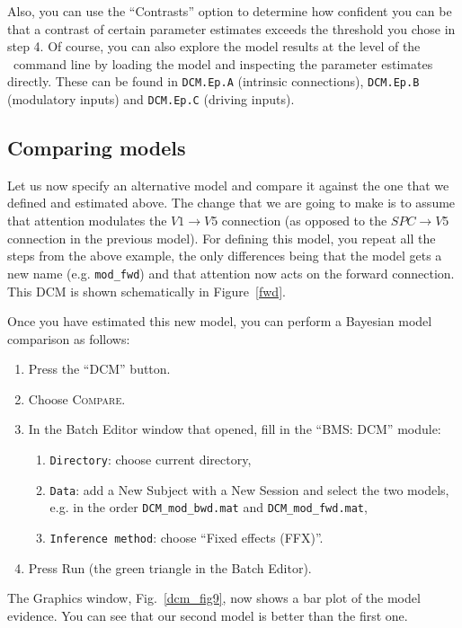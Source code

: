 Also, you can use the ``Contrasts'' option to determine how confident you can be that a contrast of certain parameter estimates exceeds the threshold you chose in step 4.
Of course, you can also explore the model results at the level of the \matlab\ command line by loading the model and inspecting the parameter estimates directly. These can be found in \texttt{DCM.Ep.A} (intrinsic connections), \texttt{DCM.Ep.B} (modulatory inputs) and \texttt{DCM.Ep.C} (driving inputs).

\subsection{Comparing models}

Let us now specify an alternative model and compare it against the one that we defined and estimated above. The change that we are going to make is to assume that attention modulates the $V1 \rightarrow V5$ connection (as opposed to the $SPC \rightarrow V5$ connection in the previous model). For defining this model, you repeat all the steps from the above example, the only differences being that the model gets a new name (e.g. \verb!mod_fwd!) and that attention now acts on the forward connection. This DCM is shown schematically in Figure~\ref{fwd}.

Once you have estimated this new model, you can perform a Bayesian model comparison as follows:
\begin{enumerate}
 \item Press the ``DCM'' button.
 \item Choose \textsc{Compare}.
 \item In the Batch Editor window that opened, fill in the ``BMS: DCM'' module:
 \begin{enumerate}
   \item \texttt{Directory}: choose current directory,
   \item \texttt{Data}: add a New Subject with a New Session and select the two models, e.g. in the order \texttt{DCM\_mod\_bwd.mat} and \texttt{DCM\_mod\_fwd.mat},
   \item \texttt{Inference method}: choose ``Fixed effects (FFX)''.
 \end{enumerate}
 \item Press Run (the green triangle in the Batch Editor).
\end{enumerate}

The Graphics window, Fig.~\ref{dcm_fig9}, now shows a bar plot of the model evidence. You can see that our second model is better than the first one.


